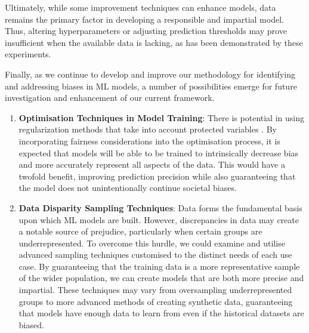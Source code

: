 \documentclass[twoside,11pt]{article}
\begin{document}
Ultimately, while some improvement techniques can enhance models, data remains the primary factor in developing a responsible and impartial model. Thus, altering hyperparameters or adjusting prediction thresholds may prove insufficient when the available data is lacking, as has been demonstrated by these experiments.


Finally, as we continue to develop and improve our methodology for identifying and addressing biases in ML models, a number of possibilities emerge for future investigation and enhancement of our current framework.

\begin{enumerate}
    \item \textbf{Optimisation Techniques in Model Training}: There is potential in using regularization methods that take into account protected variables . By incorporating fairness considerations into the optimisation process, it is expected that models will be able to be trained to intrinsically decrease bias and more accurately represent all aspects of the data. This would have a twofold benefit, improving prediction precision while also guaranteeing that the model does not unintentionally continue societal biases.

    \item \textbf{Data Disparity Sampling Techniques}: Data forms the fundamental basis upon which ML models are built. However, discrepancies in data may create a notable source of prejudice, particularly when certain groups are underrepresented. To overcome this hurdle, we could examine and utilise advanced sampling techniques customised to the distinct needs of each use case. By guaranteeing that the training data is a more representative sample of the wider population, we can create models that are both more precise and impartial. These techniques may vary from oversampling underrepresented groups to more advanced methods of creating synthetic data, guaranteeing that models have enough data to learn from even if the historical datasets are biased.
    
\end{enumerate}






\vskip 0.2in


\end{document}
